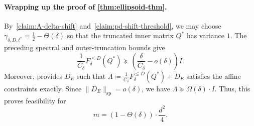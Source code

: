 \documentclass[12pt]{article}
\newcommand{\calR}{\mathcal{R}}
\newcommand{\calS}{\mathcal{S}}
\begin{document}
\paragraph{Wrapping up the proof of \cref{thm:ellipsoid-thm}.}
By~\cref{claim:A-delta-shift} and~\cref{claim:pd-shift-threshold},
we may choose
\(
    \gamma_{\delta,D,t^\ast}
    =
    \frac12-\Theta(\delta)
\)
so that the truncated inner matrix \(Q^\ast\) has variance \(1\).
The preceding spectral and outer-truncation bounds give
\[
    \frac1{C_\delta}F_\delta^{\leq D}(Q^\ast)
    \succeq
    \left(\frac{\delta}{C_\delta}-o(\delta)\right)I.
\]
Moreover,  provides \(D_E\) such
that
\(
    \Lambda
    \coloneqq
    \frac1{C_\delta}F_\delta^{\leq D}(Q^\ast)+D_E
\)
satisfies the affine constraints exactly. Since
\(\|D_E\|_{\mathrm{sp}}=o(\delta)\), we have
\(
    \Lambda\succeq \Omega(\delta) \cdot I.
\)
Thus, this proves feasibility for
\[
    m
    = \left(1-\Theta(\delta)\right) \cdot   
    \frac{d^2}{4}.
\]
%
%
%
% 
 
\end{document}
